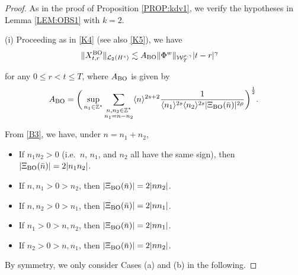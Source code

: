 \documentclass[letterpaper, 11pt,  reqno]{amsart}
\newcommand{\1}{\hspace{0.5mm}\text{I}\hspace{0.5mm}}
\newcommand{\noi}{\noindent}
\newcommand{\Z}{\mathbb{Z}}
\newcommand{\g}{\gamma}
\newcommand{\les}{\lesssim}
\newcommand{\jb}[1]
{\langle #1 \rangle}
\newcommand{\cL}{\mathcal{L}}
\newcommand{\W}{\mathcal{W}}
\newcommand{\BO}{\text{\rm BO} }
\numberwithin{equation}{section}
\numberwithin{theorem}{section}
\begin{document}
\begin{proof}
As in the proof of Proposition \ref{PROP:kdv1}, 
we verify  the hypotheses
in Lemma \ref{LEM:OBS1} 
with $k = 2$.


\medskip

\noi
(i) 
Proceeding as in \eqref{K4} (see also  \eqref{K5}), 
we have 
\begin{align*}
\|X^\BO_{t,r} \|_{\cL_2 (H^s)}
&\les
A_\BO \| \Phi^w \|_{\W_T^{\rho,\g}} 
  |t-r|^{\g}
\end{align*}

\noi
\noi
for any $0 \le r <  t \le T$, 
where $A_\BO$ is given by
\begin{align*}
A_\BO = \bigg(\sup_{n_1 \in \Z^*}
\sum_{\substack{n, n_2 \in \Z^*\\n_1 = n - n_2}} 
 \jb{n}^{2s + 2}
 \frac{1}{\jb{n_1}^{2s} \jb{n_2}^{2s} |  \Xi_\BO (\bar n)|^{2\rho}}\bigg)^\frac 12.
\end{align*}

\noi
From \eqref{B3}, we have, under $n = n_1 + n_2$,  

\smallskip

\begin{itemize}
\item[(a)]
If $n_1n_2>0$ (i.e.~$n$, $n_1$, and $n_2$ all have the same sign), then  $|\Xi_\BO(\bar n)|=2|n_1n_2|$.


\smallskip


\item[(b)]
If $n, n_1>0>n_2$,  then  $|\Xi_\BO(\bar n)|=2|n n_2|$.



\smallskip


\item[(c)]


If $n, n_2>0>n_1$,  then  $|\Xi_\BO(\bar n)|=2|n n_1|$.


\smallskip


\item[(d)]
If $n_1>0>n, n_2$,  then  $|\Xi_\BO(\bar n)|=2|n n_1|$.



\smallskip


\item[(e)]
If $n_2>0>n, n_1$,  then  $|\Xi_\BO(\bar n)|=2|n n_2|$.

\end{itemize}


\smallskip


\noi
By symmetry, 
we only consider Cases (a) and (b) in the following.




\end{proof}
\end{document}
